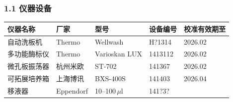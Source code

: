 \documentclass[UTF8,10pt,a4paper,fontset=fandol]{ctexart}
\newcommand{\fieldvalue}[1]{#1}
\newcommand{\handwritten}[1]{#1}
\begin{document}
\begin{center}
\subsubsection*{1.1 仪器设备}

\small
\begin{tabularx}{\textwidth}{|X|X|X|X|X|}
\hline
仪器名称 & 厂家 & 型号 & 设备编号 & 校准有效期至 \\ \hline
自动洗板机 &
\fieldvalue{Thermo} &
\fieldvalue{Wellwash} &
\fieldvalue{\handwritten{H?1314}} &
\fieldvalue{\handwritten{2026.02}}
\\ \hline
多功能酶标仪 &
\fieldvalue{Thermo} &
\fieldvalue{Varioskan LUX} &
\fieldvalue{\handwritten{1413112}} &
\fieldvalue{\handwritten{2026.02}}
\\ \hline
微孔板振荡器 &
\fieldvalue{杭州米欧} &
\fieldvalue{ST-702} &
\fieldvalue{\handwritten{141367}} &
\fieldvalue{\handwritten{2026.02}}
\\ \hline
可拓展培养箱 &
\fieldvalue{上海博讯} &
\fieldvalue{BXS-400S} &
\fieldvalue{\handwritten{141403}} &
\fieldvalue{\handwritten{2026.04}}
\\ \hline
移液器 &
\fieldvalue{Eppendorf} &
\fieldvalue{\handwritten{10--100\,\(\mu\)l}} &
\fieldvalue{\handwritten{141?3?}} &

\end{tabularx}
\end{center}
\end{document}

